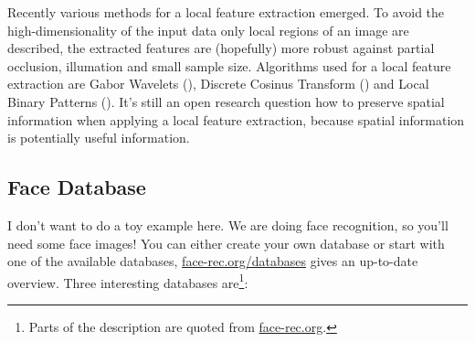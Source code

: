 Recently various methods for a local feature extraction emerged. To avoid the high-dimensionality of the input data only local regions of an image are described, the extracted features are (hopefully) more robust against partial occlusion, illumation and small sample size. Algorithms used for a local feature extraction are Gabor Wavelets (\cite{Wiskott97}), Discrete Cosinus Transform (\cite{Cardinaux2006}) and Local Binary Patterns (\cite{Ahonen04,Maturana09, Rodriguez2006}). It's still an open research question how to preserve spatial information when applying a local feature extraction, because spatial information is potentially useful information.

\subsection{Face Database}

I don't want to do a toy example here. We are doing face recognition, so you'll need some face images! You can either create your own database or start with one of the available databases, \href{http://face-rec.org/databases/}{face-rec.org/databases} gives an up-to-date overview. Three interesting databases are\footnote{Parts of the description are quoted from \href{http://face-rec.org}{face-rec.org}.}:

